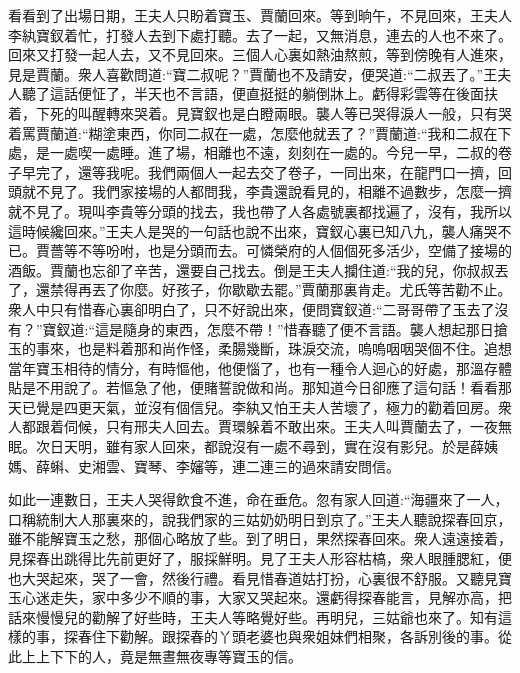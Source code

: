 \begin{parag}
    看看到了出場日期，王夫人只盼着寶玉、賈蘭回來。等到晌午，不見回來，王夫人李紈寶釵着忙，打發人去到下處打聽。去了一起，又無消息，連去的人也不來了。回來又打發一起人去，又不見回來。三個人心裏如熱油熬煎，等到傍晚有人進來，見是賈蘭。衆人喜歡問道:“寶二叔呢？”賈蘭也不及請安，便哭道:“二叔丟了。”王夫人聽了這話便怔了，半天也不言語，便直挺挺的躺倒牀上。虧得彩雲等在後面扶着，下死的叫醒轉來哭着。見寶釵也是白瞪兩眼。襲人等已哭得淚人一般，只有哭着罵賈蘭道:“糊塗東西，你同二叔在一處，怎麼他就丟了？”賈蘭道:“我和二叔在下處，是一處喫一處睡。進了場，相離也不遠，刻刻在一處的。今兒一早，二叔的卷子早完了，還等我呢。我們兩個人一起去交了卷子，一同出來，在龍門口一擠，回頭就不見了。我們家接場的人都問我，李貴還說看見的，相離不過數步，怎麼一擠就不見了。現叫李貴等分頭的找去，我也帶了人各處號裏都找遍了，沒有，我所以這時候纔回來。”王夫人是哭的一句話也說不出來，寶釵心裏已知八九，襲人痛哭不已。賈薔等不等吩咐，也是分頭而去。可憐榮府的人個個死多活少，空備了接場的酒飯。賈蘭也忘卻了辛苦，還要自己找去。倒是王夫人攔住道:“我的兒，你叔叔丟了，還禁得再丟了你麼。好孩子，你歇歇去罷。”賈蘭那裏肯走。尤氏等苦勸不止。衆人中只有惜春心裏卻明白了，只不好說出來，便問寶釵道:“二哥哥帶了玉去了沒有？”寶釵道:“這是隨身的東西，怎麼不帶！”惜春聽了便不言語。襲人想起那日搶玉的事來，也是料着那和尚作怪，柔腸幾斷，珠淚交流，嗚嗚咽咽哭個不住。追想當年寶玉相待的情分，有時慪他，他便惱了，也有一種令人迴心的好處，那溫存體貼是不用說了。若慪急了他，便賭誓說做和尚。那知道今日卻應了這句話！看看那天已覺是四更天氣，並沒有個信兒。李紈又怕王夫人苦壞了，極力的勸着回房。衆人都跟着伺候，只有邢夫人回去。賈環躲着不敢出來。王夫人叫賈蘭去了，一夜無眠。次日天明，雖有家人回來，都說沒有一處不尋到，實在沒有影兒。於是薛姨媽、薛蝌、史湘雲、寶琴、李嬸等，連二連三的過來請安問信。
\end{parag}


\begin{parag}
    如此一連數日，王夫人哭得飲食不進，命在垂危。忽有家人回道:“海疆來了一人，口稱統制大人那裏來的，說我們家的三姑奶奶明日到京了。”王夫人聽說探春回京，雖不能解寶玉之愁，那個心略放了些。到了明日，果然探春回來。衆人遠遠接着，見探春出跳得比先前更好了，服採鮮明。見了王夫人形容枯槁，衆人眼腫腮紅，便也大哭起來，哭了一會，然後行禮。看見惜春道姑打扮，心裏很不舒服。又聽見寶玉心迷走失，家中多少不順的事，大家又哭起來。還虧得探春能言，見解亦高，把話來慢慢兒的勸解了好些時，王夫人等略覺好些。再明兒，三姑爺也來了。知有這樣的事，探春住下勸解。跟探春的丫頭老婆也與衆姐妹們相聚，各訴別後的事。從此上上下下的人，竟是無晝無夜專等寶玉的信。
\end{parag}


